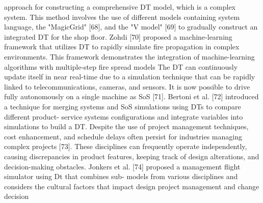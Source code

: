 approach for constructing a comprehensive DT model, which is
a complex system. This method involves the use of different
models containing system language, the "MagicGrid" [68], and
the "V model" [69] to gradually construct an integrated DT for
the shop floor.
Zohdi [70] proposed a machine-learning framework that
utilizes DT to rapidly simulate fire propagation in complex
environments. This framework demonstrates the integration of
machine-learning algorithms with multiple-step fire spread
models The DT can continuously update itself in near real-time
due to a simulation technique that can be rapidly linked to
telecommunications, cameras, and sensors. It is now possible to
drive fully autonomously on a single machine as SoS [71].
Bertoni et al. [72] introduced a technique for merging systems
and SoS simulations using DTs to compare different product-
service systems configurations and integrate variables into
simulations to build a DT.
Despite the use of project management techniques, cost
enhancement, and schedule delays often persist for industries
managing complex projects [73]. These disciplines can
frequently operate independently, causing discrepancies in
product features, keeping track of design alterations, and
decision-making obstacles. Jonkers et al. [74] proposed a
management flight simulator using Dt that combines sub-
models from various disciplines and considers the cultural
factors that impact design project management and change
decision



